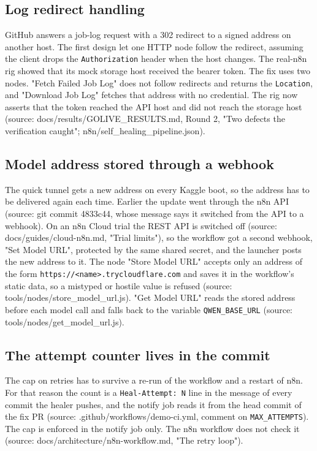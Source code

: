 \documentclass[11pt,a4paper]{report}
\begin{document}
\subsection{Log redirect handling}

GitHub answers a job-log request with a 302 redirect to a signed address on another host. The first design let one HTTP node follow the redirect, assuming the client drops the \texttt{Authorization} header when the host changes. The real-n8n rig showed that its mock storage host received the bearer token. The fix uses two nodes. "Fetch Failed Job Log" does not follow redirects and returns the \texttt{Location}, and "Download Job Log" fetches that address with no credential. The rig now asserts that the token reached the API host and did not reach the storage host (source: docs/results/GOLIVE\_RESULTS.md, Round 2, "Two defects the verification caught"; n8n/self\_healing\_pipeline.json).

\subsection{Model address stored through a webhook}

The quick tunnel gets a new address on every Kaggle boot, so the address has to be delivered again each time. Earlier the update went through the n8n API (source: git commit 4833c44, whose message says it switched from the API to a webhook). On an n8n Cloud trial the REST API is switched off (source: docs/guides/cloud-n8n.md, "Trial limits"), so the workflow got a second webhook, "Set Model URL", protected by the same shared secret, and the launcher posts the new address to it. The node "Store Model URL" accepts only an address of the form \texttt{https:/\allowbreak{}/\allowbreak{}\textless{}name\textgreater{}.\allowbreak{}trycloudflare.\allowbreak{}com} and saves it in the workflow's static data, so a mistyped or hostile value is refused (source: tools/nodes/store\_model\_url.js). "Get Model URL" reads the stored address before each model call and falls back to the variable \texttt{QWEN\_\allowbreak{}BASE\_\allowbreak{}URL} (source: tools/nodes/get\_model\_url.js).

\subsection{The attempt counter lives in the commit}

The cap on retries has to survive a re-run of the workflow and a restart of n8n. For that reason the count is a \texttt{Heal-\allowbreak{}Attempt: N} line in the message of every commit the healer pushes, and the notify job reads it from the head commit of the fix PR (source: .github/workflows/demo-ci.yml, comment on \texttt{MAX\_\allowbreak{}ATTEMPTS}). The cap is enforced in the notify job only. The n8n workflow does not check it (source: docs/architecture/n8n-workflow.md, "The retry loop").
\end{document}
